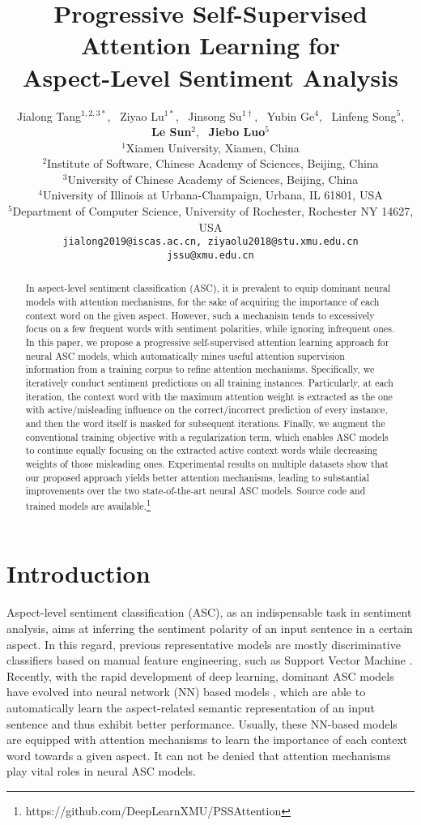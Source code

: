 \documentclass[11pt,a4paper]{article}
\title{Progressive Self-Supervised Attention Learning for \\ Aspect-Level Sentiment Analysis}
\author{Jialong Tang$^{1,2,3*}$, \ Ziyao Lu$^{1*}$, \  Jinsong Su$^{1\dagger}$, \
Yubin Ge$^{4}$, \ Linfeng Song$^{5}$, \\
\textbf{Le Sun}$^{2}$, \ \textbf{Jiebo Luo}$^{5}$\\
$^{1}$Xiamen University, Xiamen, China\\
$^{2}$Institute of Software, Chinese Academy of Sciences, Beijing, China\\
$^{3}$University of Chinese Academy of Sciences, Beijing, China\\
$^{4}$University of Illinois at Urbana-Champaign, Urbana, IL 61801, USA\\
$^{5}$Department of Computer Science, University of Rochester, Rochester NY 14627, USA\\
 {\tt jialong2019@iscas.ac.cn, ziyaolu2018@stu.xmu.edu.cn} \\
 {\tt jssu@xmu.edu.cn}
}
\date{}
\begin{document}
\maketitle
\begin{abstract}
{
\renewcommand{\thefootnote}{\fnsymbol{footnote}}
}
In aspect-level sentiment classification (ASC),
it is prevalent to equip dominant neural models with attention mechanisms,
for the sake of acquiring the importance of each context word on the given aspect.
However,
such a mechanism tends to excessively focus on a few frequent words with sentiment polarities,
while ignoring infrequent ones.
In this paper,
we propose a progressive self-supervised attention learning approach for neural ASC models,
which automatically mines useful attention supervision information from a training corpus to refine attention mechanisms.
Specifically,
we iteratively conduct sentiment predictions on all training instances.
Particularly,
at each iteration,
the context word with the maximum attention weight is extracted as the one with active/misleading influence on the correct/incorrect prediction of every instance,
and then the word itself is masked for subsequent iterations.
Finally,
we augment the conventional training objective with a regularization term,
which enables ASC models to continue equally focusing on the extracted active context words
while decreasing weights of those misleading ones.
Experimental results on multiple datasets show that our proposed approach yields better attention mechanisms,
leading to substantial improvements over the two state-of-the-art neural ASC models.
Source code and trained models are available.\footnote[1]{https://github.com/DeepLearnXMU/PSSAttention} 
\end{abstract}




\section{Introduction}
Aspect-level sentiment classification (ASC),
as an indispensable task in sentiment analysis,
aims at inferring the sentiment polarity of an input sentence in a certain aspect.
In this regard,
previous representative models are mostly discriminative classifiers
based on manual feature engineering,
such as Support Vector Machine \cite{Kiritchenko:SemEval2014,Wagner:SemEval2014}.
Recently,
with the rapid development of deep learning,
dominant ASC models have evolved into neural network (NN) based models \cite{Tang:EMNLP2016,Wang:EMNLP2016,Tang:COLING2016,Ma:IJCAI2017,Chen:EMNLP2017,Li:ACL2018,Wang:ACL2018},
which are able to automatically learn the aspect-related semantic representation of an input sentence
and thus exhibit better performance.
Usually,
these NN-based models are equipped with attention mechanisms to learn the importance of each context word towards a given aspect.
It can not be denied that attention mechanisms play vital roles in
neural ASC models.
\end{document}
